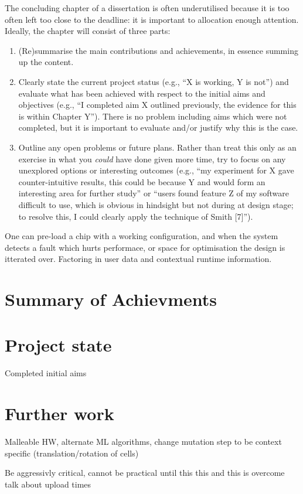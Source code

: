 \noindent
{
	\color{red}
The concluding chapter of a dissertation is often underutilised because it 
is too often left too close to the deadline: it is important to allocation
enough attention.  Ideally, the chapter will consist of three parts:

\begin{enumerate}
\item (Re)summarise the main contributions and achievements, in essence
      summing up the content.
\item Clearly state the current project status (e.g., ``X is working, Y 
      is not'') and evaluate what has been achieved with respect to the 
      initial aims and objectives (e.g., ``I completed aim X outlined 
      previously, the evidence for this is within Chapter Y'').  There 
      is no problem including aims which were not completed, but it is 
      important to evaluate and/or justify why this is the case.
\item Outline any open problems or future plans.  Rather than treat this
      only as an exercise in what you {\em could} have done given more 
      time, try to focus on any unexplored options or interesting outcomes
      (e.g., ``my experiment for X gave counter-intuitive results, this 
      could be because Y and would form an interesting area for further 
      study'' or ``users found feature Z of my software difficult to use,
      which is obvious in hindsight but not during at design stage; to 
      resolve this, I could clearly apply the technique of Smith [7]'').
\end{enumerate}

One can pre-load a chip with a working configuration, and when the system detects a fault which hurts performace, or space for optimisation the design is itterated over. Factoring in user data and contextual runtime information.
}

\section{Summary of Achievments}

\section{Project state}
Completed initial aims

\section{Further work}
Malleable HW, alternate ML algorithms, change mutation step to be context specific (translation/rotation
of cells)

Be aggressivly critical, cannot be practical until this this and this is overcome
talk about upload times
